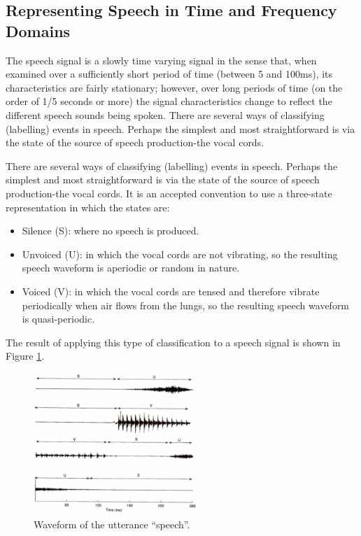 \documentclass[12pt, a4paper, twoside]{report}
\begin{document}
\subsection{Representing Speech in Time and Frequency Domains}
The speech signal is a slowly time varying signal in the sense that, when examined over a sufficiently short period of time (between 5 and 100ms), its characteristics are fairly stationary; however, over long periods of time (on the order of 1/5 seconds or more) the signal characteristics change to reflect the different speech sounds being spoken. There are several ways of classifying (labelling) events in speech. Perhaps the simplest and most straightforward is via the state of the source of speech production-the vocal cords.
\par 
There are several ways of classifying (labelling) events in speech. Perhaps the simplest and most straightforward is via the state of the source of speech production-the vocal cords. It is an accepted convention to use a three-state representation in which the states are:
\begin{itemize}[noitemsep]
\item Silence (S):  where no speech is produced.
\item Unvoiced (U): in which the vocal cords are not vibrating, so the resulting speech waveform is aperiodic or random in nature.
\item Voiced (V): in which the vocal cords are tensed and therefore vibrate periodically when air flows from the lungs, so the resulting speech waveform is quasi-periodic.
\end{itemize}
The result of applying this type of classification to a speech signal is shown in Figure \ref{fig:wave-utterance-speech}.

\begin{figure}[!h]
	\centering
	\includegraphics[width=0.55\textwidth]
	{images/chapter2/wave-utterance-speech}
	\caption{Waveform of the utterance ``speech''.}
	\label{fig:wave-utterance-speech}
\end{figure}
\end{document}
